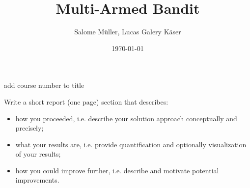 \documentclass[10pt]{article}
\title{Multi-Armed Bandit}
\author{Salome Müller, Lucas Galery Käser}
\date{\today}
\newcommand{\todo}[1]{{\color{red}#1}}
\begin{document}
\maketitle

\todo{add course number to title}

\todo{
    Write a short report (one page) section that describes:
    \begin{itemize}
        \item how you proceeded, i.e. describe your solution approach conceptually and precisely;\\
        \item what your results are, i.e. provide quantification and optionally visualization of your results;\\
        \item how you could improve further, i.e. describe and motivate potential improvements.\\
    \end{itemize}

}
\end{document}
